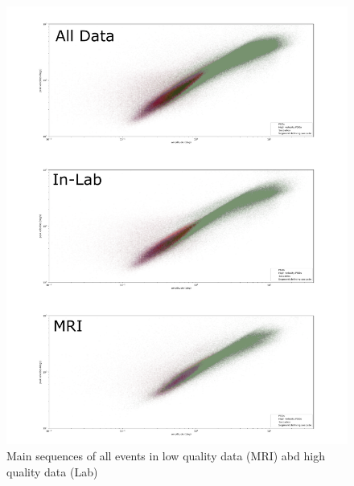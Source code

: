 \begin{figure}[h!]
  \includegraphics[width=1\textwidth]{img/overallCompar.pdf}

  \caption{Main sequences of all events in low quality data (MRI) abd high
  quality data (Lab)}

  \label{fig:overallComp}
\end{figure}

